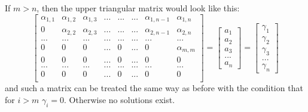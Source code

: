 \documentclass{article}
\begin{document}
If $m>n$, then the upper triangular matrix would look like this:
$$\begin{bmatrix}
    \alpha_{1, 1}&\alpha_{1, 2}&\alpha_{1, 3}&...&...&...&\alpha_{1, n-1}&\alpha_{1, n}\\
    0&\alpha_{2, 2}&\alpha_{2, 3}&...&...&...&\alpha_{2, n-1}&\alpha_{2, n}\\
    ...     &   ...    & ...      &...&...&... & ...       & ...\\
    0&0&0&...&0&...&0&\alpha_{m, m}\\
    0&0&0&...&0&...&0&0\\
    ...     &   ...    & ...      &...&...&... & ...       & ...\\
    0&0&0&...&0&...&0&0\\
\end{bmatrix}=\begin{bmatrix}
    a_1\\a_2\\a_3\\...\\a_n
\end{bmatrix}=\begin{bmatrix}
    \gamma_1\\\gamma_2\\\gamma_3\\...\\\gamma_n
\end{bmatrix}$$
and such a matrix can be treated the same way as before with the condition that for $i>m$ $\gamma_i=0$. Otherwise no solutions exist.
\end{document}
